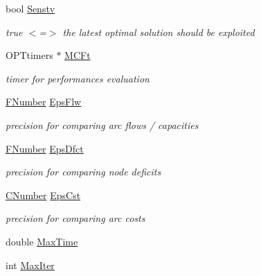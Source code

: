 \begin{DoxyCompactItemize}
bool \mbox{\hyperlink{class_m_c_f_class_a89b691e0b125c33ab526888ab754e461}{Senstv}}
\begin{DoxyCompactList}\small\item\em true $<$=$>$ the latest optimal solution should be exploited \end{DoxyCompactList}\item 
\mbox{\label{class_m_c_f_class_ab7624a057d988dd8f61b038ff459cd0b}} 
O\+P\+Ttimers $\ast$ \mbox{\hyperlink{class_m_c_f_class_ab7624a057d988dd8f61b038ff459cd0b}{M\+C\+Ft}}
\begin{DoxyCompactList}\small\item\em timer for performances evaluation \end{DoxyCompactList}\item 
\mbox{\label{class_m_c_f_class_a65b1c456efbc2e544b82cb6553f6df8d}} 
\mbox{\hyperlink{class_m_c_f_class_aeea3e5951d222b2a8e57de1b4246a909}{F\+Number}} \mbox{\hyperlink{class_m_c_f_class_a65b1c456efbc2e544b82cb6553f6df8d}{Eps\+Flw}}
\begin{DoxyCompactList}\small\item\em precision for comparing arc flows / capacities \end{DoxyCompactList}\item 
\mbox{\label{class_m_c_f_class_a9159ee7ca50477fd57f6854ff73b2874}} 
\mbox{\hyperlink{class_m_c_f_class_aeea3e5951d222b2a8e57de1b4246a909}{F\+Number}} \mbox{\hyperlink{class_m_c_f_class_a9159ee7ca50477fd57f6854ff73b2874}{Eps\+Dfct}}
\begin{DoxyCompactList}\small\item\em precision for comparing node deficits \end{DoxyCompactList}\item 
\mbox{\label{class_m_c_f_class_aad8c11b8ba9065dd3bc0f7b5ec423869}} 
\mbox{\hyperlink{class_m_c_f_class_a24d0627ba8213afe1ec4ebeb4508e8f1}{C\+Number}} \mbox{\hyperlink{class_m_c_f_class_aad8c11b8ba9065dd3bc0f7b5ec423869}{Eps\+Cst}}
\begin{DoxyCompactList}\small\item\em precision for comparing arc costs \end{DoxyCompactList}\item 
double \mbox{\hyperlink{class_m_c_f_class_a8bad127f3e412819d99baff0c51e5be8}{Max\+Time}}
\item 
int \mbox{\hyperlink{class_m_c_f_class_a259eaddd4d91ec0a7d00ff6db0a3f40a}{Max\+Iter}}
\end{DoxyCompactItemize}


